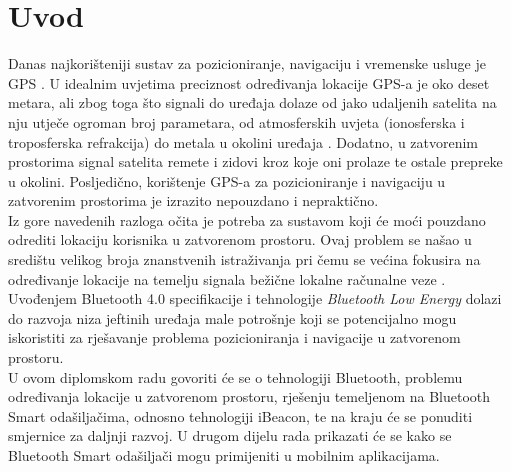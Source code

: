 \chapter{Uvod}

Danas najkorišteniji sustav za pozicioniranje, navigaciju i vremenske usluge je GPS . %
U idealnim uvjetima preciznost određivanja lokacije GPS-a je oko deset metara, ali zbog toga što signali do uređaja dolaze od jako udaljenih satelita na nju utječe ogroman broj parametara, od atmosferskih uvjeta (ionosferska i troposferska refrakcija) do metala u okolini uređaja \citep{schneider2013}. 
Dodatno, u zatvorenim prostorima signal satelita remete i zidovi kroz koje oni prolaze te ostale prepreke u okolini.
Posljedično, korištenje GPS-a za pozicioniranje i navigaciju u zatvorenim prostorima je izrazito nepouzdano i nepraktično.
\\

Iz gore navedenih razloga očita je potreba za sustavom koji će moći pouzdano odrediti lokaciju korisnika u zatvorenom prostoru. 
Ovaj problem se našao u središtu velikog broja znanstvenih istraživanja pri čemu se većina fokusira na određivanje lokacije na temelju signala bežične lokalne računalne veze . %
Uvođenjem Bluetooth 4.0 specifikacije i tehnologije \textit{Bluetooth Low Energy} dolazi do razvoja niza jeftinih uređaja male potrošnje koji se potencijalno mogu iskoristiti za rješavanje problema pozicioniranja i navigacije u zatvorenom prostoru.
\\

U ovom diplomskom radu govoriti će se o tehnologiji Bluetooth, problemu određivanja lokacije u zatvorenom prostoru, rješenju temeljenom na Bluetooth Smart odašiljačima, odnosno tehnologiji iBeacon, te na kraju će se ponuditi smjernice za daljnji razvoj. 
U drugom dijelu rada prikazati će se kako se Bluetooth Smart odašiljači mogu primijeniti u mobilnim aplikacijama.